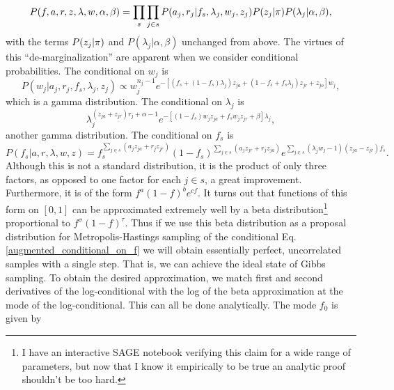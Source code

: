 \documentclass[nofootinbib,amssymb,amsmath]{revtex4}
\begin{document}
\begin{equation}
P(f, a, r, z, \lambda, w, \alpha, \beta) = \prod_s \prod_{j \in s} P(a_j, r_j | f_s, \lambda_j, w_j,  z_j) P(z_j | {\rm \pi}) P(\lambda_j | \alpha, \beta),
\end{equation}
%
with the terms $P(z_j | {\rm \pi})$ and $P(\lambda_j | \alpha, \beta)$ unchanged from above.  The virtues of this ``de-marginalization'' are apparent when we consider conditional probabilities.  The conditional on $w_j$ is
%
\begin{equation}
P(w_j | a_j, r_j, f_s, \lambda_j, z_j) \propto w_j^{n_j - 1} e^{- \left[ \left( f_s + (1-f_s) \lambda_j \right) z_{ja} + \left( 1 - f_s + f_s \lambda_j \right) z_{jr} + z_{jo} \right] w_j},
\label{augmented_conditional_on_w}
\end{equation}
%
which is a gamma distribution.  The conditional on $\lambda_j$ is
%
\begin{equation}
\lambda_j^{ (z_{ja} + z_{jr})r_j + \alpha - 1} e^{-\left[ (1-f_s) w_j z_{ja} + f_s w_j z_{jr} + \beta \right] \lambda_j},
\label{augmented_conditional_on_lambda}
\end{equation}
another gamma distribution.  The conditional on $f_s$ is
%
\begin{equation}
P(f_s | a, r, \lambda, w, z) = f_s^{\sum_{j \in s} (a_j z_{ja} + r_j z_{jr})}  (1-f_s)^{\sum_{j \in s} (a_j z_{jr} + r_j z_{ja})} e^{ \sum_{j \in s} (\lambda_j w_j - 1) (z_{ja} - z_{jr})f_s}.
\label{augmented_conditional_on_f}
\end{equation}
%
Although this is not a standard distribution, it is the product of only three factors, as opposed to one factor for each $j \in s$, a great improvement.  Furthermore, it is of the form $f^a (1-f)^b e^{c f}$.  It turns out that functions of this form on $[0,1]$ can be approximated extremely well by a beta distribution\footnote{I have an interactive SAGE notebook verifying this claim for a wide range of parameters, but now that I know it empirically to be true an analytic proof shouldn't be too hard.} proportional to $f^\sigma (1-f)^\tau$.  Thus if we use this beta distribution as a proposal distribution for Metropolis-Hastings sampling of the conditional Eq. \ref{augmented_conditional_on_f} we will obtain essentially perfect, uncorrelated samples with a single step.  That is, we can achieve the ideal state of Gibbs sampling.  To obtain the desired approximation, we match first and second derivatives of the log-conditional with the log of the beta approximation at the mode of the log-conditional.  This can all be done analytically.  The mode $f_0$ is given by
\end{document}
